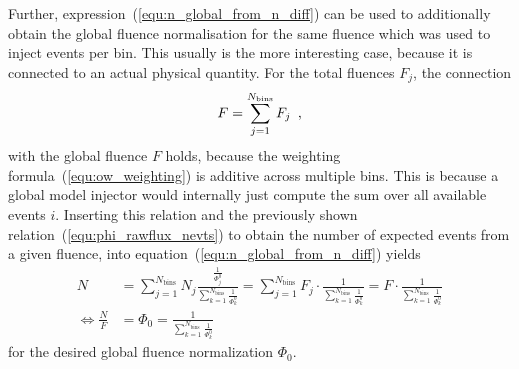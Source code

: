 Further, expression~(\ref{equ:n_global_from_n_diff}) can be used to additionally obtain the global fluence normalisation for the same fluence which was used to inject events per bin.
This usually is the more interesting case, because it is connected to an actual physical quantity.
For the total fluences $F_j$, the connection
\begin{equation}
  F = \sum_{j=1}^{N_\text{bins}} F_j
  \enspace\text{,}
\end{equation}
with the global fluence $F$ holds, because the weighting formula~(\ref{equ:ow_weighting}) is additive across multiple bins.
This is because a global model injector would internally just compute the sum over all available events $i$.
Inserting this relation and the previously shown relation~(\ref{equ:phi_rawflux_nevts}) to obtain the number of expected events from a given fluence, into equation~(\ref{equ:n_global_from_n_diff}) yields
\begin{align}
  N &= \sum_{j=1}^{N_\text{bins}} N_j
      \frac{\frac{1}{\Phi_j^0}}{\sum_{k=1}^{N_\text{bins}} \frac{1}{\Phi_k^0}}
    = \sum_{j=1}^{N_\text{bins}} F_j \cdot \frac{1}{\sum_{k=1}^{N_\text{bins}} \frac{1}{\Phi_k^0}}
    = F \cdot \frac{1}{\sum_{k=1}^{N_\text{bins}} \frac{1}{\Phi_k^0}} \\
  \Leftrightarrow
  \frac{N}{F} &= \Phi_0 = \frac{1}{\sum_{k=1}^{N_\text{bins}} \frac{1}{\Phi_k^0}}
  \label{equ:phi_global_from_phi_diff}
\end{align}
for the desired global fluence normalization $\Phi_0$.

